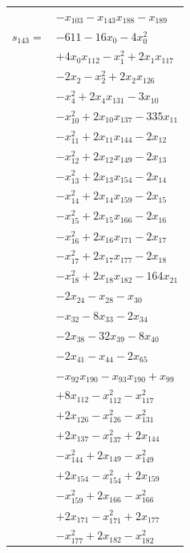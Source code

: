 \begin{longtable}{@{}r@{\;}l@{}}
 & \(\displaystyle -x_{103} -x_{143}x_{188} -x_{189}\) \\[3pt]
\(s_{143}=\) & \(\displaystyle -611 -16x_{0} -4x_{0}^{2}\) \\
 & \(\displaystyle +4x_{0}x_{112} -x_{1}^{2} +2x_{1}x_{117}\) \\
 & \(\displaystyle -2x_{2} -x_{2}^{2} +2x_{2}x_{126}\) \\
 & \(\displaystyle -x_{4}^{2} +2x_{4}x_{131} -3x_{10}\) \\
 & \(\displaystyle -x_{10}^{2} +2x_{10}x_{137} -335x_{11}\) \\
 & \(\displaystyle -x_{11}^{2} +2x_{11}x_{144} -2x_{12}\) \\
 & \(\displaystyle -x_{12}^{2} +2x_{12}x_{149} -2x_{13}\) \\
 & \(\displaystyle -x_{13}^{2} +2x_{13}x_{154} -2x_{14}\) \\
 & \(\displaystyle -x_{14}^{2} +2x_{14}x_{159} -2x_{15}\) \\
 & \(\displaystyle -x_{15}^{2} +2x_{15}x_{166} -2x_{16}\) \\
 & \(\displaystyle -x_{16}^{2} +2x_{16}x_{171} -2x_{17}\) \\
 & \(\displaystyle -x_{17}^{2} +2x_{17}x_{177} -2x_{18}\) \\
 & \(\displaystyle -x_{18}^{2} +2x_{18}x_{182} -164x_{21}\) \\
 & \(\displaystyle -2x_{24} -x_{28} -x_{30}\) \\
 & \(\displaystyle -x_{32} -8x_{33} -2x_{34}\) \\
 & \(\displaystyle -2x_{38} -32x_{39} -8x_{40}\) \\
 & \(\displaystyle -2x_{41} -x_{44} -2x_{65}\) \\
 & \(\displaystyle -x_{92}x_{190} -x_{93}x_{190} +x_{99}\) \\
 & \(\displaystyle +8x_{112} -x_{112}^{2} -x_{117}^{2}\) \\
 & \(\displaystyle +2x_{126} -x_{126}^{2} -x_{131}^{2}\) \\
 & \(\displaystyle +2x_{137} -x_{137}^{2} +2x_{144}\) \\
 & \(\displaystyle -x_{144}^{2} +2x_{149} -x_{149}^{2}\) \\
 & \(\displaystyle +2x_{154} -x_{154}^{2} +2x_{159}\) \\
 & \(\displaystyle -x_{159}^{2} +2x_{166} -x_{166}^{2}\) \\
 & \(\displaystyle +2x_{171} -x_{171}^{2} +2x_{177}\) \\
 & \(\displaystyle -x_{177}^{2} +2x_{182} -x_{182}^{2}\) \\

\end{longtable}
